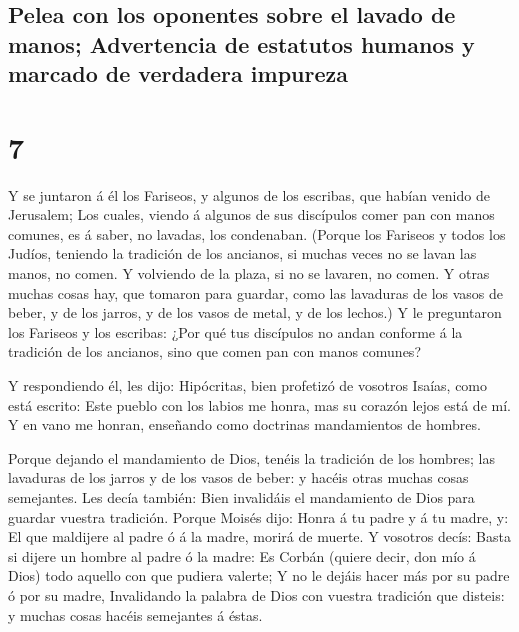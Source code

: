 \hypertarget{pelea-con-los-oponentes-sobre-el-lavado-de-manos-advertencia-de-estatutos-humanos-y-marcado-de-verdadera-impureza}{%
\subsection{Pelea con los oponentes sobre el lavado de manos;
Advertencia de estatutos humanos y marcado de verdadera
impureza}\label{pelea-con-los-oponentes-sobre-el-lavado-de-manos-advertencia-de-estatutos-humanos-y-marcado-de-verdadera-impureza}}

\hypertarget{section-6}{%
\section{7}\label{section-6}}

 Y se juntaron á él los Fariseos, y algunos de los
escribas, que habían venido de Jerusalem;  Los cuales,
viendo á algunos de sus discípulos comer pan con manos comunes, es á
saber, no lavadas, los condenaban.  (Porque los Fariseos y
todos los Judíos, teniendo la tradición de los ancianos, si muchas veces
no se lavan las manos, no comen.  Y volviendo de la plaza,
si no se lavaren, no comen. Y otras muchas cosas hay, que tomaron para
guardar, como las lavaduras de los vasos de beber, y de los jarros, y de
los vasos de metal, y de los lechos.)  Y le preguntaron
los Fariseos y los escribas: ¿Por qué tus discípulos no andan conforme á
la tradición de los ancianos, sino que comen pan con manos comunes?

 Y respondiendo él, les dijo: Hipócritas, bien profetizó
de vosotros Isaías, como está escrito: Este pueblo con los labios me
honra, mas su corazón lejos está de mí.  Y en vano me
honran, enseñando como doctrinas mandamientos de hombres.

 Porque dejando el mandamiento de Dios, tenéis la
tradición de los hombres; las lavaduras de los jarros y de los vasos de
beber: y hacéis otras muchas cosas semejantes.  Les decía
también: Bien invalidáis el mandamiento de Dios para guardar vuestra
tradición.  Porque Moisés dijo: Honra á tu padre y á tu
madre, y: El que maldijere al padre ó á la madre, morirá de muerte.
 Y vosotros decís: Basta si dijere un hombre al padre ó
la madre: Es Corbán (quiere decir, don mío á Dios) todo aquello con que
pudiera valerte;  Y no le dejáis hacer más por su padre ó
por su madre,  Invalidando la palabra de Dios con vuestra
tradición que disteis: y muchas cosas hacéis semejantes á éstas.

